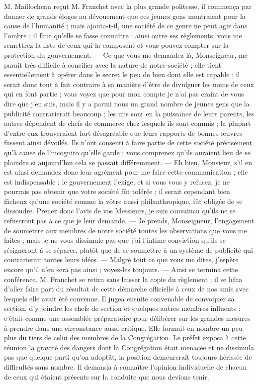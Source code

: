 M. Maillocheau reçut M. Franchet avec la plus grande politesse, il commença par donner de grands éloges au dévouement que ces jeunes gens montraient pour la cause de l'humanité ; mais ajouta-t-il, une société de ce genre ne peut agir dans l'ombre ; il faut qu'elle se fasse connaître : ainsi outre ses règlements, vous me remettrez la liste de ceux qui la composent et vous pouvez compter sur la protection du gouvernement. — Ce que vous me demandez là, Monseigneur, me paraît très difficile à concilier avec la nature de notre société ; elle tient essentiellement à opérer dans le secret le peu de bien dont elle est capable ; il serait donc tout à fait contraire à sa manière d'être de divulguer les noms de ceux qui en font partie ; vous voyez que pour mon compte je n'ai pas craint de vous dire que j'en suis, mais il y a parmi nous un grand nombre de jeunes gens que la publicité contrarierait beaucoup ; les uns sont en la puissance de leurs parents, les autres dépendent de chefs de commerce chez lesquels ils sont commis ; la plupart d'entre eux trouveraient fort désagréable que leurs rapports de bonnes œuvres fussent ainsi dévoilés. Ils n'ont consenti à faire partie de cette société précisément qu'à cause de l'incognito qu'elle garde ; vous comprenez qu'ils auraient lieu de se plaindre si aujourd'hui cela se passait différemment. — Eh bien, Monsieur, s'il en est ainsi demandez
donc leur agrément pour me faire cette communication ; elle est indispensable ; le gouvernement l'exige, et si vous vous y refusez, je ne pourrais pas obtenir que votre société fût tolérée ; il serait cependant bien fâcheux qu'une société comme la vôtre aussi philanthropique, fût obligée de se dissoudre. Prenez donc l'avis de vos Messieurs, je suis convaincu qu'ils ne se refuseront pas à ce que je leur demande. — Je prends, Monseigneur, l'engagement de soumettre aux membres de notre société toutes les observations que vous me faites ; mais je ne vous dissimule pas que j'ai l'intime conviction qu'ils se résigneront à se séparer, plutôt que de se soumettre à un système de publicité qui contrarierait toutes leurs idées. — Malgré tout ce que vous me dites, j'espère encore qu'il n'en sera pas ainsi ; voyez-les toujours. — Ainsi se termina cette conférence. M. Franchet se retira sans laisser la copie du règlement ; il se hâta d'aller faire part du résultat de cette démarche officielle à ceux de nos amis avec lesquels elle avait été convenue. Il jugea ensuite convenable de convoquer sa section, d'y joindre les chefs de section et quelques autres membres influents ; c'était comme une assemblée préparatoire pour délibérer sur les grandes mesures à prendre dans une circonstance aussi critique. Elle formait en nombre un peu plus du tiers de celui des membres de la Congrégation. Le préfet exposa à cette réunion la gravité des dangers dont la Congrégation était menacée et ne dissimula pas que quelque parti qu'on adoptât, la position demeurerait toujours hérissée de difficultés sans nombre. Il demanda à connaître l'opinion individuelle de chacun de ceux qui étaient présents sur la conduite que nous devions tenir.

